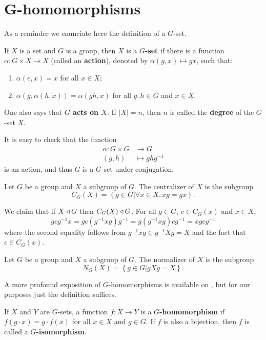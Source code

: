 \section{G-homomorphisms}

As a reminder we enunciate here the definition of a $G$-set.

\begin{definition}
    \cite[p.~55]{RotmanITG}
    If $X$ is a set and $G$ is a group, then $X$ is a \textbf{$G$-set} if there is a function $\alpha : G \times X \to X$ (called an \textbf{action}), denoted by $\alpha(g, x) \mapsto gx$, such that:
    \begin{enumerate}
    \item $\alpha(e, x) = x$ for all $x \in X$;
    \item $\alpha(g, \alpha(h, x)) = \alpha(gh, x)$ for all $g, h \in G$ and $x \in X$.
    \end{enumerate}
    One also says that \textbf{$G$ acts on $X$}. If $|X| = n$, then $n$ is called the \textbf{degree} of the $G$-set $X$.
\end{definition}

It is easy to check that the function 
\begin{align*}
    \alpha \colon G \times G &\rightarrow G \\
    (g,h) &\mapsto ghg^{-1}
\end{align*} is an action, and thus $G$ is a $G$-set under conjugation. 

\begin{definition}
    Let $G$ be a group and $X$ a subgroup of $G$. The centralizer of $X$ is the subgroup
    $$
    C_G(X) = \left\{ g \in G | \forall x \in X, xg = gx \right\}.
    $$
\end{definition}

We claim that if $X \triangleleft G$ then $C_G(X) \triangleleft G$. For all $g \in G$, $c \in C_G(x)$ and $x \in X$,
$$
gcg^{-1}x = gc(g^{-1}xg)g^{-1} = g(g^{-1}xg)cg^{-1} = xgcg^{-1} 
$$
where the second equality follows from $g^{-1}xg \in g^{-1}Xg = X$ and the fact that $c \in C_G(x)$.

\begin{definition}
    Let $G$ be a group and $X$ a subgroup of $G$. The normalizer of $X$ is the subgroup
    $$
    N_G(X) = \left\{ g \in G | gXg = X \right\}.
    $$
\end{definition}

A more profound exposition of $G$-homomorphisms is available on \cite[p.~260]{RotmanITG}, but for our purposes just the definition suffices.

\begin{definition}
    If $X$ and $Y$ are $G$-sets, a function $f: X \rightarrow Y$ is a \textbf{$G$-homomorphism} if $f(g \cdot x) = g \cdot f(x)$ for all $x \in X$ and $g \in G$. If $f$ is also a bijection, then $f$ is called a \textbf{$G$-isomorphism}.

\end{definition}